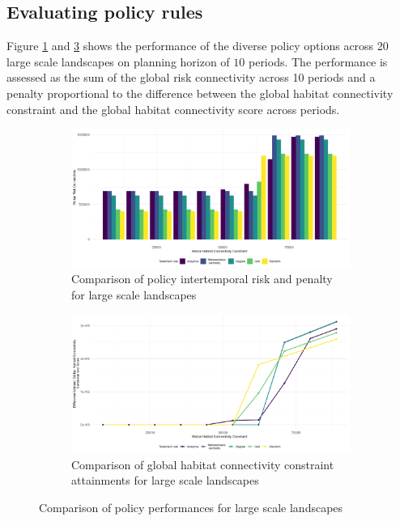 \FloatBarrier

\subsection{Evaluating policy rules }
\label{sec:evaluating_policy}
Figure \ref{fig:comparison_policies} and \ref{fig:comparison_constraints} shows the performance of the diverse policy options across 20 large scale landscapes on planning horizon of $10$ periods. The performance is assessed as the sum of the global risk connectivity across 10 periods and a penalty proportional to the difference between the global habitat connectivity constraint and the global habitat connectivity score across periods. 

\begin{figure}
\centering
    \begin{subfigure}[b]{.8\textwidth}
	\includegraphics[width=\textwidth]{figures/wildland/comparing_performances.jpg}
\caption{Comparison of policy intertemporal risk and penalty for large scale landscapes}
	\label{fig:comparison_policies}
	\end{subfigure}
	\begin{subfigure}[b]{.8\textwidth}
	\includegraphics[width=\textwidth]{figures/wildland/comparing_performances_biod.jpg}
\caption{Comparison of global habitat connectivity constraint attainments for large scale landscapes}
	 \label{fig:comparison_constraints}
	 \end{subfigure}
	 \caption{Comparison of policy performances for large scale landscapes}
\end{figure}

